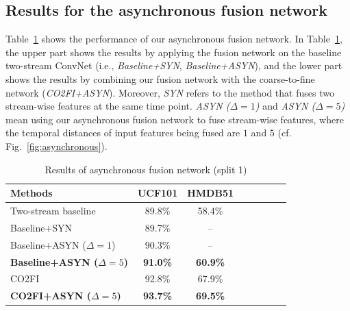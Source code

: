 \documentclass[letterpaper]{article} %
\begin{document}
{%


\subsection{Results for the asynchronous fusion network}

Table~\ref{tab:cmcTable2} shows the performance of our asynchronous fusion network. In Table~\ref{tab:cmcTable2}, the upper part shows the results by applying the fusion network on the baseline two-stream ConvNet (i.e., \emph{Baseline+SYN}, \emph{Baseline+ASYN}), and the lower part shows the results by combining our fusion network with the coarse-to-fine network (\emph{CO2FI+ASYN}). Moreover, \emph{SYN} refers to the method that fuses two stream-wise features at the same time point. \emph{ASYN ($\Delta=1$)} and \emph{ASYN ($\Delta=5$)} mean using our asynchronous fusion network to fuse stream-wise features, where the temporal distances of input features being fused are $1$ and $5$ (cf. Fig.~\ref{fig:asynchronous}).



\begin{table}
\centering
\caption{Results of asynchronous fusion network (split 1) %
}\label{tab:cmcTable2}
\scriptsize{
\begin{tabular}{|p{4.5cm}|c|*{5}{c|}c}
\hline
\textbf{Methods}& UCF101& HMDB51 \\
\hline
Two-stream baseline &  89.8\%& 58.4\% \\%
Baseline+SYN & 89.7\%& --\\
Baseline+ASYN ($\Delta=1$) & 90.3\% & -- \\
{\bf Baseline+ASYN ($\Delta=5$)}&  {\bf 91.0\%} &{\bf 60.9\%}\\
\hline
CO2FI & 92.8\%& 67.9\%  \\
{\bf CO2FI+ASYN ($\Delta=5$)}& {\bf 93.7\%}& {\bf 69.5\%}  \\
\hline
\end{tabular}}
\end{table}


}
\end{document}

